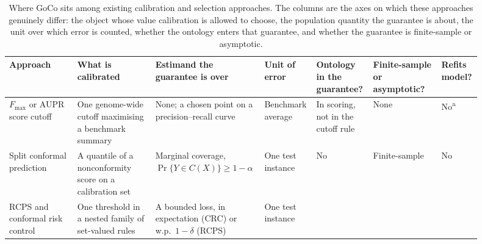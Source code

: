 \begin{table}[!t]
\centering
\caption{Where GoCo sits among existing calibration and selection approaches. The columns are the axes on which these approaches genuinely differ: the object whose value calibration is allowed to choose, the population quantity the guarantee is about, the unit over which error is counted, whether the ontology enters that guarantee, and whether the guarantee is finite-sample or asymptotic.}
\label{tab:positioning}
\scriptsize
\setlength{\tabcolsep}{2.5pt}
\renewcommand{\arraystretch}{1.05}
\begin{tabular}{%
 >{\raggedright\arraybackslash}p{0.145\linewidth}%
 >{\raggedright\arraybackslash}p{0.165\linewidth}%
 >{\raggedright\arraybackslash}p{0.200\linewidth}%
 >{\raggedright\arraybackslash}p{0.080\linewidth}%
 >{\raggedright\arraybackslash}p{0.110\linewidth}%
 >{\raggedright\arraybackslash}p{0.145\linewidth}%
 >{\raggedright\arraybackslash}p{0.055\linewidth}}
\toprule
Approach & What is calibrated & Estimand the guarantee is over & Unit of error & Ontology in the guarantee? & Finite-sample or asymptotic? & Re\-fits model? \\
\midrule
$F_{\max}$ or AUPR score cutoff \cite{kulmanov2020deepgoplus,yao2021netgo2}
 & One genome-wide cutoff maximising a benchmark summary
 & None; a chosen point on a precision--recall curve
 & Benchmark average
 & In scoring, not in the cutoff rule
 & None
 & No\textsuperscript{a} \\
Split conformal prediction \cite{angelopoulos2023gentle}
 & A quantile of a nonconformity score on a calibration set
 & Marginal coverage, $\Pr\{Y\in C(X)\}\ge1-\alpha$
 & One test instance
 & No
 & Finite-sample
 & No \\
RCPS and conformal risk control \cite{bates2021,angelopoulos2024crc}
 & One threshold in a nested family of set-valued rules
 & A bounded loss, in expectation (CRC) or w.p.\ $1-\delta$ (RCPS)
 & One test instance

\end{tabular}
\end{table}
